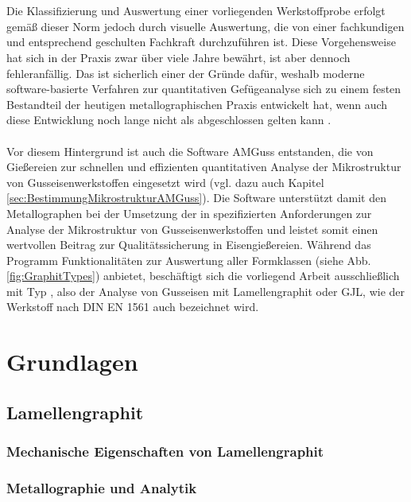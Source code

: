 \documentclass[
fontsize=10pt, 
listof = totoc,
parskip = half	
]{report}
\newcommand{\uproman}[1]{\uppercase\expandafter{\romannumeral#1}}
\begin{document}
\\\\
Die Klassifizierung und Auswertung einer vorliegenden Werkstoffprobe erfolgt gemäß dieser Norm jedoch durch visuelle Auswertung, die von einer fachkundigen und entsprechend geschulten Fachkraft durchzuführen ist. Diese Vorgehensweise hat sich in der Praxis zwar über viele Jahre bewährt, ist aber dennoch fehleranfällig. Das ist sicherlich einer der Gründe dafür, weshalb moderne software-basierte Verfahren zur quantitativen Gefügeanalyse sich zu einem festen Bestandteil der heutigen metallographischen Praxis entwickelt hat, wenn auch diese Entwicklung noch lange nicht als abgeschlossen gelten kann \cite{schumann_oettel_2016}.
\\\\
Vor diesem Hintergrund ist auch die Software AMGuss entstanden, die von Gießereien zur schnellen und effizienten quantitativen Analyse der Mikrostruktur von Gusseisenwerkstoffen eingesetzt wird (vgl. dazu auch Kapitel \ref{sec:BestimmungMikrostrukturAMGuss}). Die Software  unterstützt  damit den Metallographen bei der Umsetzung der in \cite{ISO945} spezifizierten Anforderungen zur Analyse der Mikrostruktur von Gusseisenwerkstoffen und leistet somit einen wertvollen Beitrag zur Qualitätssicherung in Eisengießereien. Während das Programm Funktionalitäten zur Auswertung aller Formklassen (siehe Abb. \ref{fig:GraphitTypes}) anbietet, beschäftigt sich die vorliegend Arbeit ausschließlich mit Typ \uproman{1}, also der Analyse von Gusseisen mit Lamellengraphit oder GJL, wie der Werkstoff nach DIN EN 1561 auch bezeichnet wird. 




\chapter{Grundlagen}
\label{ch:Grundlagen}

\section{Lamellengraphit}
\label{subsec:Lamellengraphit}

\subsection{Mechanische Eigenschaften von Lamellengraphit}
\label{subsec:MechanischeEigenschaften}

\subsection{Metallographie und Analytik}
\label{sec:MetallographieAnalytik}
\end{document}
